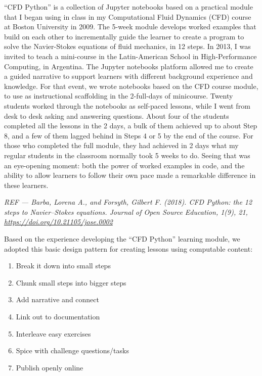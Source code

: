 \documentclass[]{book}
\providecommand{\tightlist}{%
  \setlength{\itemsep}{0pt}\setlength{\parskip}{0pt}}
\begin{document}
``CFD Python'' is a collection of Jupyter notebooks based on a practical
module that I began using in class in my Computational Fluid Dynamics
(CFD) course at Boston University in 2009. The 5-week module develops
worked examples that build on each other to incrementally guide the
learner to create a program to solve the Navier-Stokes equations of
fluid mechanics, in 12 steps. In 2013, I was invited to teach a
mini-course in the Latin-American School in High-Performance Computing,
in Argentina. The Jupyter notebooks platform allowed me to create a
guided narrative to support learners with different background
experience and knowledge. For that event, we wrote notebooks based on
the CFD course module, to use as instructional scaffolding in the
2-full-days of minicourse. Twenty students worked through the notebooks
as self-paced lessons, while I went from desk to desk asking and
answering questions. About four of the students completed all the
lessons in the 2 days, a bulk of them achieved up to about Step 8, and a
few of them lagged behind in Steps 4 or 5 by the end of the course. For
those who completed the full module, they had achieved in 2 days what my
regular students in the classroom normally took 5 weeks to do. Seeing
that was an eye-opening moment: both the power of worked examples in
code, and the ability to allow learners to follow their own pace made a
remarkable difference in these learners.

\emph{REF --- Barba, Lorena A., and Forsyth, Gilbert F. (2018). CFD
Python: the 12 steps to Navier--Stokes equations. Journal of Open Source
Education, 1(9), 21, \url{https://doi.org/10.21105/jose.0002} }

Based on the experience developing the ``CFD Python'' learning module,
we adopted this basic design pattern for creating lessons using
computable content:

\begin{enumerate}
\def\labelenumi{\arabic{enumi}.}
\tightlist
\item
  Break it down into small steps
\item
  Chunk small steps into bigger steps
\item
  Add narrative and connect
\item
  Link out to documentation
\item
  Interleave easy exercises
\item
  Spice with challenge questions/tasks
\item
  Publish openly online
\end{enumerate}
\end{document}

